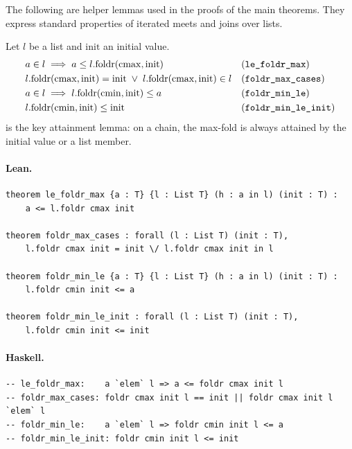 \documentclass[11pt,a4paper]{article}
\begin{document}
The following are helper lemmas used in the proofs of the main theorems.
They express standard properties of iterated meets and joins over lists.

\begin{thm}
Let $l$ be a list and $\mathrm{init}$ an initial value.
\begin{align*}
  &a \in l \implies a \le l.\mathrm{foldr}(\mathrm{cmax}, \mathrm{init})
  && \text{(\texttt{le\_foldr\_max})} \\
  &l.\mathrm{foldr}(\mathrm{cmax}, \mathrm{init}) = \mathrm{init}
   \;\vee\; l.\mathrm{foldr}(\mathrm{cmax}, \mathrm{init}) \in l
  && \text{(\texttt{foldr\_max\_cases})} \\
  &a \in l \implies l.\mathrm{foldr}(\mathrm{cmin}, \mathrm{init}) \le a
  && \text{(\texttt{foldr\_min\_le})} \\
  &l.\mathrm{foldr}(\mathrm{cmin}, \mathrm{init}) \le \mathrm{init}
  && \text{(\texttt{foldr\_min\_le\_init})}
\end{align*}
 is the key attainment lemma: on a chain, the
max-fold is always attained by the initial value or a list member.
\end{thm}

\paragraph{Lean.}
\begin{lstlisting}[style=lean]
theorem le_foldr_max {a : T} {l : List T} (h : a in l) (init : T) :
    a <= l.foldr cmax init

theorem foldr_max_cases : forall (l : List T) (init : T),
    l.foldr cmax init = init \/ l.foldr cmax init in l

theorem foldr_min_le {a : T} {l : List T} (h : a in l) (init : T) :
    l.foldr cmin init <= a

theorem foldr_min_le_init : forall (l : List T) (init : T),
    l.foldr cmin init <= init
\end{lstlisting}

\paragraph{Haskell.}
\begin{lstlisting}[style=haskell]
-- le_foldr_max:    a `elem` l => a <= foldr cmax init l
-- foldr_max_cases: foldr cmax init l == init || foldr cmax init l `elem` l
-- foldr_min_le:    a `elem` l => foldr cmin init l <= a
-- foldr_min_le_init: foldr cmin init l <= init
\end{lstlisting}
\end{document}
